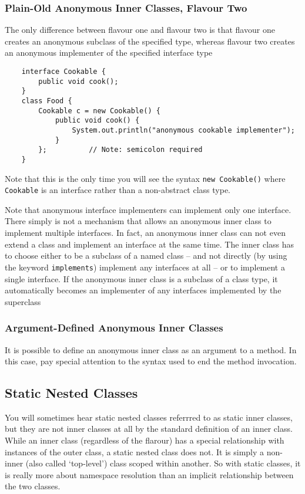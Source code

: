 \subsubsection{Plain-Old Anonymous Inner Classes, Flavour Two}
The only difference between flavour one and flavour two is that flavour one 
creates an anonymous subclass of the specified type, whereas flavour two 
creates an anonymous implementer of the specified interface type
\begin{verbatim}
    interface Cookable {
        public void cook();
    }
    class Food {
        Cookable c = new Cookable() {
            public void cook() {
                System.out.println("anonymous cookable implementer");
            }
        };          // Note: semicolon required
    }
\end{verbatim}
Note that this is the only time you will see the syntax \verb#new Cookable()# 
where \verb#Cookable# is an interface rather than a non-abstract class type.

Note that anonymous interface implementers can implement only one interface.  
There simply is not a mechanism that allows an anonymous inner class to 
implement multiple interfaces. In fact, an anonymous inner class can not even 
extend a class and implement an interface at the same time. The inner class has 
to choose either to be a subclass of a named class -- and not directly (by 
using the keyword \verb#implements#) implement any interfaces at all -- or to 
implement a single interface. If the anonymous inner class is a subclass of a 
class type, it automatically becomes an implementer of any interfaces 
implemented by the superclass

\subsubsection{Argument-Defined Anonymous Inner Classes}
It is possible to define an anonymous inner class as an argument to a method.  
In this case, pay special attention to the syntax used to end the method 
invocation.

\subsection{Static Nested Classes}
You will sometimes hear static nested classes referrred to as static inner 
classes, but they are not inner classes at all by the standard definition of an 
inner class. While an inner class (regardless of the flarour) has a special 
relationship with instances of the outer class, a static nested class does not.
It is simply a non-inner (also called `top-level') class scoped within another.
So with static classes, it is really more about namespace resolution than an 
implicit relationship between the two classes.

